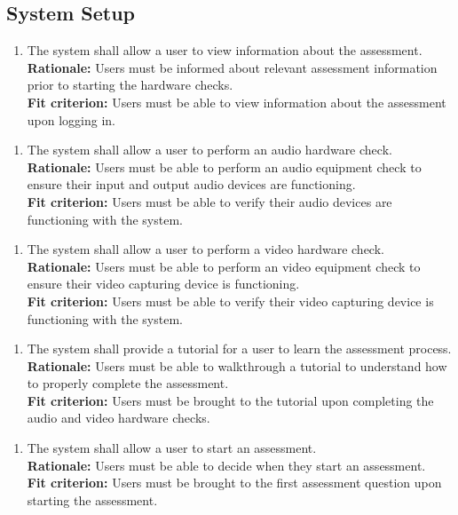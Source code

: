 \documentclass[12pt]{article}
\begin{document}
\subsection{System Setup}
\begin{enumerate}[{FR-SS}1. ]
  \item The system shall allow a user to view information about the assessment.\\
  \textbf{Rationale: }Users must be informed about relevant assessment information prior to starting the hardware checks.\\
  \textbf{Fit criterion: }Users must be able to view information about the assessment upon logging in.
\end{enumerate}
\begin{enumerate}[{FR-SS}2. ]
  \item The system shall allow a user to perform an audio hardware check.\\
  \textbf{Rationale: }Users must be able to perform an audio equipment check to ensure their input and output audio devices are functioning.\\
  \textbf{Fit criterion: }Users must be able to verify their audio devices are functioning with the system.
\end{enumerate}
\begin{enumerate}[{FR-SS}3. ]
  \item The system shall allow a user to perform a video hardware check.\\
  \textbf{Rationale: }Users must be able to perform an video equipment check to ensure their video capturing device is functioning.\\
  \textbf{Fit criterion: }Users must be able to verify their video capturing device is functioning with the system.  
\end{enumerate}
\begin{enumerate}[{FR-SS}4. ]
  \item The system shall provide a tutorial for a user to learn the assessment process.\\
  \textbf{Rationale: }Users must be able to walkthrough a tutorial to understand how to properly complete the assessment.\\
  \textbf{Fit criterion: }Users must be brought to the tutorial upon completing the audio and video hardware checks.  
\end{enumerate}
\begin{enumerate}[{FR-SS}5. ]
  \item The system shall allow a user to start an assessment.\\
  \textbf{Rationale: }Users must be able to decide when they start an assessment.\\
  \textbf{Fit criterion: }Users must be brought to the first assessment question upon starting the assessment.  
\end{enumerate}
\end{document}
